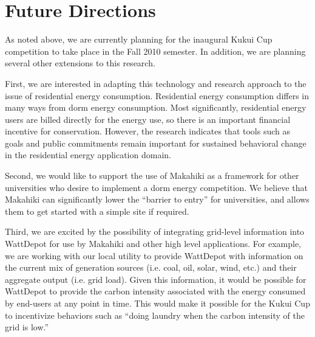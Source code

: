
\section{Future Directions}
\label{sec:future-directions}

As noted above, we are currently planning for the inaugural Kukui Cup
competition to take place in the Fall 2010 semester.  In addition, we are planning
several other extensions to this research.

First, we are interested in adapting this technology and research approach
to the issue of residential energy consumption.  Residential energy
consumption differs in many ways from dorm energy consumption. Most
significantly, residential energy users are billed directly for the energy
use, so there is an important financial incentive for conservation.
However, the research indicates that tools such as goals and public
commitments remain important for sustained behavioral change in the residential
energy application domain.

Second, we would like to support the use of Makahiki as a framework for
other universities who desire to implement a dorm energy competition.  We
believe that Makahiki can significantly lower the ``barrier to entry'' for
universities, and allows them to get started with a simple site if required. 

Third, we are excited by the possibility of integrating grid-level
information into WattDepot for use by Makahiki and other high level
applications.  For example, we are working with our local utility to
provide WattDepot with information on the current mix of generation sources
(i.e. coal, oil, solar, wind, etc.) and their aggregate output
(i.e. grid load).  Given this information, it would be possible for
WattDepot to provide the carbon intensity associated with the energy
consumed by end-users at any point in time.  This would make it possible
for the Kukui Cup to incentivize behaviors such as ``doing laundry when the
carbon intensity of the grid is low.''





